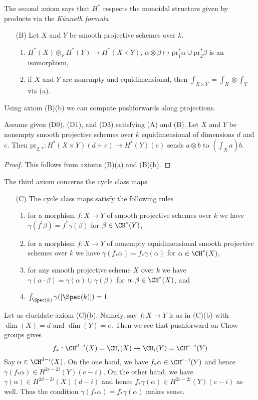 \noindent
The second axiom says that $H^*$ respects the monoidal structure
given by products via the {\it K\"unneth formula}
\begin{enumerate}
\item[(B)] Let $X$ and $Y$ be smooth projective schemes over $k$.
\begin{enumerate}
\item $H^*(X) \otimes_F H^*(Y) \to H^*(X \times Y)$,
$\alpha \otimes \beta \mapsto \text{pr}_1^*\alpha \cup \text{pr}_2^*\beta$
is an isomorphism,
\item if $X$ and $Y$ are nonempty and equidimensional, then
$\int_{X \times Y} = \int_X \otimes \int_Y$ via (a).
\end{enumerate}
\end{enumerate}
Using axiom (B)(b) we can compute pushforwards along projections.

\begin{lemma}
\label{lemma-pr2star}
Assume given (D0), (D1), and (D3) satisfying (A) and (B).
Let $X$ and $Y$ be nonempty smooth projective schemes over $k$
equidimensional of dimensions $d$ and $e$. Then
$\text{pr}_{2, *} : H^*(X \times Y)(d + e) \to H^*(Y)(e)$ sends
$a \otimes b$ to $(\int_X a) b$.
\end{lemma}

\begin{proof}
This follows from axioms (B)(a) and (B)(b).
\end{proof}

\noindent
The third axiom concerns the cycle class maps
\begin{enumerate}
\item[(C)] The cycle class maps satisfy the following rules
\begin{enumerate}
\item for a morphism $f : X \to Y$ of smooth projective schemes over
$k$ we have $\gamma(f^!\beta) = f^*\gamma(\beta)$ for $\beta \in \CH^*(Y)$,
\item for a morphism $f : X \to Y$ of nonempty
equidimensional smooth projective schemes over $k$ we have
$\gamma(f_*\alpha) = f_*\gamma(\alpha)$ for $\alpha \in \CH^*(X)$,
\item for any smooth projective scheme $X$ over $k$ we have
$\gamma(\alpha \cdot \beta) = \gamma(\alpha) \cup \gamma(\beta)$
for $\alpha, \beta \in \CH^*(X)$, and
\item $\int_{\Spec(k)} \gamma([\Spec(k)]) = 1$.
\end{enumerate}
\end{enumerate}
Let us elucidate axiom (C)(b). Namely, say $f : X \to Y$ is
as in (C)(b) with $\dim(X) = d$ and $\dim(Y) = e$. Then we
see that pushforward on Chow groups gives
$$
f_* : \CH^{d - i}(X) = \CH_i(X) \to \CH_i(Y) = \CH^{e - i}(Y)
$$
Say $\alpha \in \CH^{d - i}(X)$. On the one hand, we have
$f_*\alpha \in \CH^{e - i}(Y)$ and hence
$\gamma(f_*\alpha) \in H^{2e - 2i}(Y)(e - i)$.
On the other hand, we have
$\gamma(\alpha) \in H^{2d - 2i}(X)(d - i)$ and hence
$f_*\gamma(\alpha) \in H^{2e - 2i}(Y)(e - i)$ as well.
Thus the condition $\gamma(f_*\alpha) = f_*\gamma(\alpha)$ makes sense.

